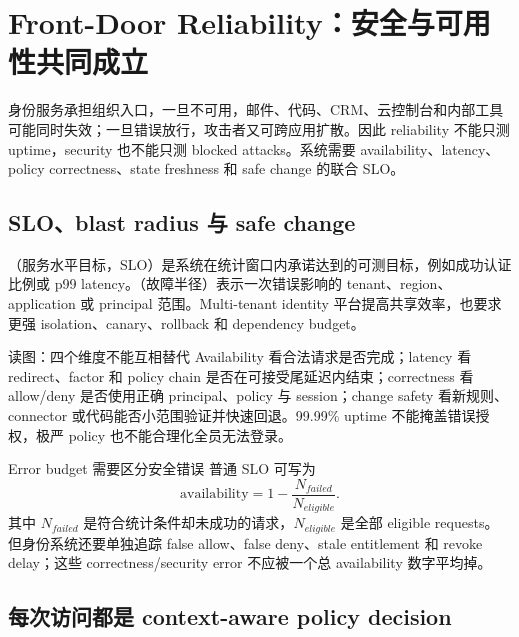 \section{Front-Door Reliability：安全与可用性共同成立}

身份服务承担组织入口，一旦不可用，邮件、代码、CRM、云控制台和内部工具可能同时失效；一旦错误放行，攻击者又可跨应用扩散。因此 reliability 不能只测 uptime，security 也不能只测 blocked attacks。系统需要 availability、latency、policy correctness、state freshness 和 safe change 的联合 SLO。

\subsection{SLO、blast radius 与 safe change}

（服务水平目标，SLO）是系统在统计窗口内承诺达到的可测目标，例如成功认证比例或 p99 latency。（故障半径）表示一次错误影响的 tenant、region、application 或 principal 范围。Multi-tenant identity 平台提高共享效率，也要求更强 isolation、canary、rollback 和 dependency budget。


\begin{knowledgebox}{读图：四个维度不能互相替代}
Availability 看合法请求是否完成；latency 看 redirect、factor 和 policy chain 是否在可接受尾延迟内结束；correctness 看 allow/deny 是否使用正确 principal、policy 与 session；change safety 看新规则、connector 或代码能否小范围验证并快速回退。99.99\% uptime 不能掩盖错误授权，极严 policy 也不能合理化全员无法登录。
\end{knowledgebox}

\begin{importantbox}{Error budget 需要区分安全错误}
普通 SLO 可写为
\[
\mathrm{availability}=1-\frac{N_{failed}}{N_{eligible}}.
\]
其中 $N_{failed}$ 是符合统计条件却未成功的请求，$N_{eligible}$ 是全部 eligible requests。但身份系统还要单独追踪 false allow、false deny、stale entitlement 和 revoke delay；这些 correctness/security error 不应被一个总 availability 数字平均掉。
\end{importantbox}

\subsection{每次访问都是 context-aware policy decision}

